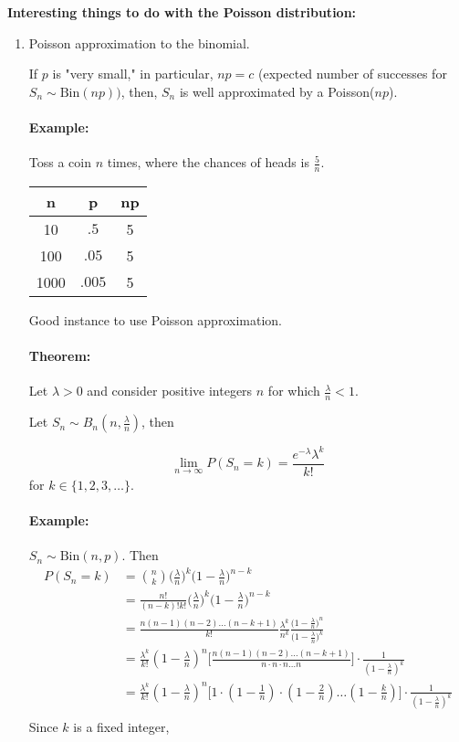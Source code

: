 \documentclass[letterpaper,12pt]{article}
\begin{document}
\textbf{Interesting things to do with the Poisson distribution:}

\begin{enumerate}
    \item Poisson approximation to the binomial.


        If $p$ is "very small," in particular, $np = c$ (expected number of successes for $S_n \sim \mathrm{Bin}
        (np))$, then, $S_n$  is well approximated by a Poisson($np$).

        \paragraph{Example:} Toss a coin $n$ times, where the chances of heads is $\frac{5}{n}$.
\begin{center}
\begin{tabular}{|c | c | c|} 
 \hline
 n & p & np \\ [0.5ex] 
 \hline
 10 & $.5$ & 5 \\ 
 \hline
 100 & $.05$ & 5  \\
 \hline
 1000 & $.005$ & 5  \\ [1ex]
 \hline
\end{tabular}
\end{center}


Good instance to use Poisson approximation.


\paragraph{Theorem:} Let $\lambda > 0$ and consider positive integers $n$ for which $\frac{\lambda}{
n} < 1.$


Let $S_n \sim B_n(n, \frac{\lambda}{n})$, then

\[
    \lim_{n\to \infty}P(S_n = k) = \frac{e^{-\lambda}\lambda^k}{k!}
\] for $k \in \{1,2,3,\ldots\}$.


\paragraph{Example:}
$S_n \sim \mathrm{Bin}(n,p)$. Then
\begin{align*}
    P(S_n = k)&= \binom{n}{k}\bigg(\frac{\lambda}{n}\bigg)^k \bigg(1-\frac{\lambda}{n}\bigg)^{n-k}\\
              &= \frac{n!}{(n-k)! k!}\bigg(\frac{\lambda}{n}\bigg)^k \bigg(1-\frac{\lambda}{n}\bigg)^{n-k}\\
              &=  \frac{n(n-1)(n-2) \ldots (n-k+1)}{k!}\frac{\lambda^k}{n^k} 
              \frac{\bigg(1-\frac{\lambda}{n}\bigg)^{n}}{\bigg(1-\frac{\lambda}{n}\bigg)^k}\\
              &= \frac{\lambda^k}{k!} (1-\frac{\lambda}{n})^n \bigg[\frac{n(n-1)(n-2)\ldots (n-k+1)}{
              n\cdot n \cdot n \ldots n}\bigg] \cdot \frac{1}{(1-\frac{\lambda}{n})^k}\\
              &= \frac{\lambda^k}{k!} (1-\frac{\lambda}{n})^n \bigg[1\cdot
              (1-\frac{1}{n})\cdot(1-\frac{2}{n}) \ldots (1-\frac{k}{n})\bigg] \cdot \frac{1}{(1-\frac{\lambda}{n})^k}\\
\end{align*}
Since $k$ is a fixed integer, 


\end{enumerate}
\end{document}
